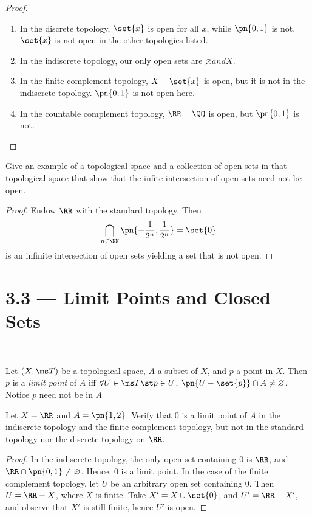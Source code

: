 \begin{proof}
  \begin{enumerate}
    \item In the discrete topology, $\set{x}$ is open for all $x$, while
      $\pn{0,1}$ is not. $\set{x}$ is not open in the other topologies listed.
    \item In the indiscrete topology, our only open sets are $\varnothing and
      X$.
    \item In the finite complement topology, $X - \set{x}$ is open, but it is
      not in the indiscrete topology. $\pn{0,1}$ is not open here.
    \item In the countable complement topology, $\RR - \QQ$ is open, but
      $\pn{0,1}$ is not.
  \end{enumerate}
\end{proof}
\begin{problem}[3.7]
  Give an example of a topological space and a collection of open sets in that
  topological space that show that the infite intersection of open sets need not
  be open.
\end{problem}
\begin{proof}
  Endow $\RR$ with the standard topology. Then
  \[
    \bigcap_{n \in \NN} \pn{-\frac{1}{2^n}, \frac{1}{2^n}} = \set{0}
  \]
  is an infinite intersection of open sets yielding a set that is not open.
\end{proof}
\section*{3.3 --- Limit Points and Closed Sets}~
\begin{definition}
  Let $(X,\ms T)$ be a topological space, $A$ a subset of $X$, and $p$ a point
  in $X$. Then $p$ is a \emph{limit point} of $A$ iff $\forall U \in \ms T \st p
  \in U$, $\pn{U - \set{p}} \cap A \neq \varnothing$. Notice $p$ need not be in
  $A$
\end{definition}
\begin{problem}[3.8]
  Let $X = \RR$ and $A = \pn{1,2}$. Verify that $0$ is a limit point of $A$ in
  the indiscrete topology and the finite complement topology, but not in the
  standard topology nor the discrete topology on $\RR$.
\end{problem}
\begin{proof}\color{red}
  In the indiscrete topology, the only open set containing $0$ is $\RR$, and
  $\RR \cap \pn{0,1} \neq \varnothing$. Hence, $0$ is a limit point. In the case
  of the finite complement topology, let $U$ be an arbitrary open set containing
  $0$. Then $U = \RR - X$, where $X$ is finite. Take $X' = X \cup \set{0}$, and
  $U' = \RR - X'$, and observe that $X'$ is still finite, hence $U'$ is open.
\end{proof}

